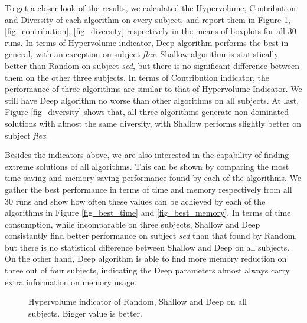 To get a closer look of the results, we calculated the Hypervolume, Contribution and Diversity of each algorithm on every subject, and report them in Figure \ref{fig_hypervolume}, \ref{fig_contribution}, \ref{fig_diversity} respectively in the means of boxplots for all 30 runs. In terms of Hypervolume indicator, Deep algorithm performs the best in general, with an exception on subject \emph{flex}. Shallow algorithm is statistically better than Random on subject \emph{sed}, but there is no significant difference between them on the other three subjects. In terms of Contribution indicator, the performance of three algorithms are similar to that of Hypervolume Indicator. We still have Deep algorithm no worse than other algorithms on all subjects. At last, Figure \ref{fig_diversity} shows that, all three algorithms generate non-dominated solutions with almost the same diversity, with Shallow performs slightly better on subject \emph{flex}.

Besides the indicators above, we are also interested in the capability of finding extreme solutions of all algorithms. This can be shown by comparing the most time-saving and memory-saving performance found by each of the algorithms. We gather the best performance in terms of time and memory respectively from all 30 runs and show how often these values can be achieved by each of the algorithms in Figure \ref{fig_best_time} and \ref{fig_best_memory}. In terms of time consumption, while incomparable on three subjects, Shallow and Deep consistantly find better performance on subject \emph{sed} than that found by Random, but there is no statistical difference between Shallow and Deep on all subjects. On the other hand, Deep algorithm is able to find more memory reduction on three out of four subjects, indicating the Deep parameters almost always carry extra information on memory usage.

\begin{figure}[htbp]
	\centering
	\caption{Hypervolume indicator of Random, Shallow and Deep on all subjects. Bigger value is better.}\label{fig_hypervolume}
\end{figure}

